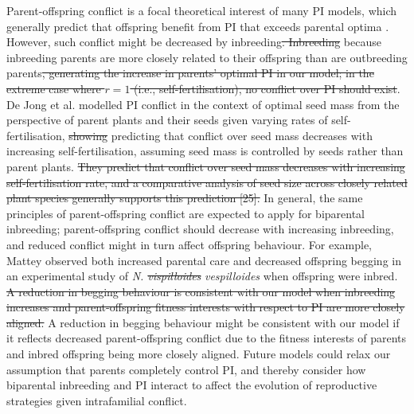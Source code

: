 \documentclass[12pt]{article}
\begin{document}
Parent-offspring conflict is a focal theoretical interest of many PI models, which generally predict that offspring benefit from PI that exceeds parental optima \cite[][]{Macnair1978, Parker1978, Parker1985, DeJong2005}. However, such conflict might be decreased by inbreeding{\color{red}\st{. Inbreeding}} {\color{blue}because inbreeding} parents are more closely related to their offspring than are outbreeding parents{\color{red}\st{, generating the increase in parents' optimal PI in our model; in the extreme case where $r=1$ (i.e., self-fertilisation), no conflict over PI should exist}}. De Jong et al. \cite{DeJong2005} modelled PI conflict in the context of optimal seed mass from the perspective of parent plants and their seeds given varying rates of self-fertilisation, {\color{red}\st{showing}} predicting that conflict over seed mass decreases with increasing self-fertilisation, assuming seed mass is controlled by seeds rather than parent plants.{\color{red}\st{ They predict that conflict over seed mass decreases with increasing self-fertilisation rate, and a comparative analysis of seed size across closely related plant species generally supports this prediction [25].}} In general, the same principles of parent-offspring conflict are expected to apply for biparental inbreeding; parent-offspring conflict should decrease with increasing inbreeding, and reduced conflict might in turn affect offspring behaviour. For example, Mattey \cite{Mattey2014} observed both increased parental care and decreased offspring begging in an experimental study of \textit{N. {\color{red}\st{vispilloides}}} {\color{blue}\textit{vespilloides}} when offspring were inbred. {\color{red}\st{A reduction in begging behaviour is consistent with our model when inbreeding increases and parent-offspring fitness interests with respect to PI are more closely aligned.}} {\color{blue}A reduction in begging behaviour might be consistent with our model if it reflects decreased parent-offspring conflict due to the fitness interests of parents and inbred offspring being more closely aligned.} Future models could relax our assumption that parents completely control PI, and thereby consider how biparental inbreeding and PI interact to affect the evolution of reproductive strategies given intrafamilial conflict.
\end{document}

